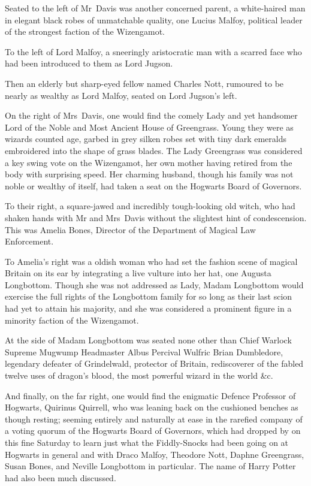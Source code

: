 Seated to the left of Mr~Davis was another concerned parent, a white-haired man in elegant black robes of unmatchable quality, one Lucius Malfoy, political leader of the strongest faction of the Wizengamot.

To the left of Lord Malfoy, a sneeringly aristocratic man with a scarred face who had been introduced to them as Lord Jugson.

Then an elderly but sharp-eyed fellow named Charles Nott, rumoured to be nearly as wealthy as Lord Malfoy, seated on Lord Jugson’s left.

On the right of Mrs~Davis, one would find the comely Lady and yet handsomer Lord of the Noble and Most Ancient House of Greengrass. Young they were as wizards counted age, garbed in grey silken robes set with tiny dark emeralds embroidered into the shape of grass blades. The Lady Greengrass was considered a key swing vote on the Wizengamot, her own mother having retired from the body with surprising speed. Her charming husband, though his family was not noble or wealthy of itself, had taken a seat on the Hogwarts Board of Governors.

To their right, a square-jawed and incredibly tough-looking old witch, who had shaken hands with Mr and Mrs~Davis without the slightest hint of condescension. This was Amelia Bones, Director of the Department of Magical Law Enforcement.

To Amelia’s right was a oldish woman who had set the fashion scene of magical Britain on its ear by integrating a live vulture into her hat, one Augusta Longbottom. Though she was not addressed as Lady, Madam Longbottom would exercise the full rights of the Longbottom family for so long as their last scion had yet to attain his majority, and she was considered a prominent figure in a minority faction of the Wizengamot.

At the side of Madam Longbottom was seated none other than Chief Warlock Supreme Mugwump Headmaster Albus Percival Wulfric Brian Dumbledore, legendary defeater of Grindelwald, protector of Britain, rediscoverer of the fabled twelve uses of dragon’s blood, the most powerful wizard in the world \&c.

And finally, on the far right, one would find the enigmatic Defence Professor of Hogwarts, Quirinus Quirrell, who was leaning back on the cushioned benches as though resting; seeming entirely and naturally at ease in the rarefied company of a voting quorum of the Hogwarts Board of Governors, which had dropped by on this fine Saturday to learn just what the Fiddly-Snocks had been going on at Hogwarts in general and with Draco Malfoy, Theodore Nott, Daphne Greengrass, Susan Bones, and Neville Longbottom in particular. The name of Harry Potter had also been much discussed.

